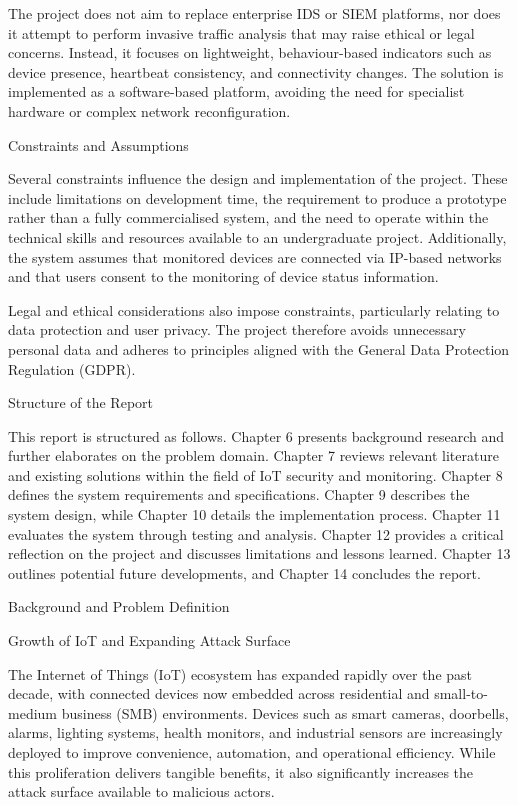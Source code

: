 The project does not aim to replace enterprise IDS or SIEM platforms, nor does it attempt to perform invasive traffic analysis that may raise ethical or legal concerns. Instead, it focuses on lightweight, behaviour-based indicators such as device presence, heartbeat consistency, and connectivity changes. The solution is implemented as a software-based platform, avoiding the need for specialist hardware or complex network reconfiguration.

Constraints and Assumptions

Several constraints influence the design and implementation of the project. These include limitations on development time, the requirement to produce a prototype rather than a fully commercialised system, and the need to operate within the technical skills and resources available to an undergraduate project. Additionally, the system assumes that monitored devices are connected via IP-based networks and that users consent to the monitoring of device status information.

Legal and ethical considerations also impose constraints, particularly relating to data protection and user privacy. The project therefore avoids unnecessary personal data and adheres to principles aligned with the General Data Protection Regulation (GDPR).

Structure of the Report

This report is structured as follows. Chapter 6 presents background research and further elaborates on the problem domain. Chapter 7 reviews relevant literature and existing solutions within the field of IoT security and monitoring. Chapter 8 defines the system requirements and specifications. Chapter 9 describes the system design, while Chapter 10 details the implementation process. Chapter 11 evaluates the system through testing and analysis. Chapter 12 provides a critical reflection on the project and discusses limitations and lessons learned. Chapter 13 outlines potential future developments, and Chapter 14 concludes the report.

Background and Problem Definition

Growth of IoT and Expanding Attack Surface

The Internet of Things (IoT) ecosystem has expanded rapidly over the past decade, with connected devices now embedded across residential and small-to-medium business (SMB) environments. Devices such as smart cameras, doorbells, alarms, lighting systems, health monitors, and industrial sensors are increasingly deployed to improve convenience, automation, and operational efficiency. While this proliferation delivers tangible benefits, it also significantly increases the attack surface available to malicious actors.

